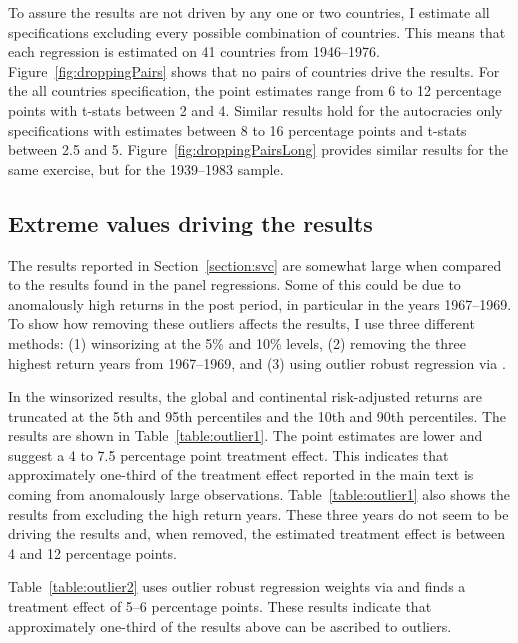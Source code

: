 To assure the results are not driven by any one or two countries, I estimate all specifications excluding every possible combination of countries. This means that each regression is estimated on 41 countries from 1946--1976. Figure~\ref{fig:droppingPairs} shows that no pairs of countries drive the results. For the all countries specification, the point estimates range from 6 to 12 percentage points with t-stats between 2 and 4. Similar results hold for the autocracies only specifications with estimates between 8 to 16 percentage points and t-stats between 2.5 and 5. Figure~\ref{fig:droppingPairsLong} provides similar results for the same exercise, but for the 1939--1983 sample.





\subsection{Extreme values driving the results}\label{section:outliers}

The results reported in Section~\ref{section:svc} are somewhat large when compared to the results found in the panel regressions. Some of this could be due to anomalously high returns in the post period, in particular in the years 1967--1969. To show how removing these outliers affects the results, I use three different methods: (1) winsorizing at the 5\% and 10\% levels, (2) removing the three highest return years from 1967--1969, and (3) using outlier robust regression via \cite{Li2006}.

In the winsorized results,  the global and continental risk-adjusted returns are truncated at the 5th and 95th percentiles and the 10th and 90th percentiles. The results are shown in Table~\ref{table:outlier1}. The point estimates are lower and suggest a 4 to 7.5 percentage point treatment effect. This indicates that approximately one-third of the treatment effect reported in the main text is coming from anomalously large observations. Table~\ref{table:outlier1} also shows the results from excluding the high return years. These three years do not seem to be driving the results and, when removed, the estimated treatment effect is between 4 and 12 percentage points.



Table~\ref{table:outlier2} uses outlier robust regression weights via \cite{Li2006} and finds a treatment effect of 5--6 percentage points. These results indicate that approximately one-third of the results above can be ascribed to outliers.

